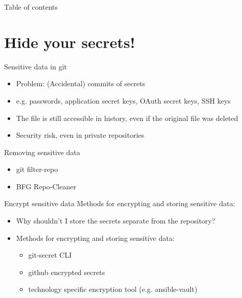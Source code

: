 \documentclass[compress,aspectratio=169]{beamer}
\begin{document}
	\begin{frame}[plain]
		\titlepage
	\end{frame}

	\begin{frame}[t]{Table of contents}
		\tableofcontents[subsectionstyle=hide/hide]
	\end{frame}


	\section{Hide your secrets!}

		\begin{frame}{Sensitive data in git}
			\begin{itemize}
				\item Problem: (Accidental) commits of secrets
				\item e.g. passwords, application secret keys, OAuth secret keys, SSH keys
				\item The file is still accessible in history, even if the original file was deleted
				\item Security risk, even in private repositories
			\end{itemize}	
		\end{frame}

		\begin{frame}{Removing sensitive data}
			\begin{itemize}
				\item git filter-repo
				\item BFG Repo-Cleaner
			\end{itemize}
		\end{frame}
		
		\begin{frame}{Encrypt sensitive data}
			Methods for encrypting and storing sensitive data:
			\begin{itemize}
				\item 	Why shouldn't I store the secrets separate from the repository?
				\item 	Methods for encrypting and storing sensitive data:
						\begin{itemize}
							\item git-secret CLI 
							\item github encrypted secrets
							\item technology specific encryption tool (e.g. ansible-vault)
						\end{itemize}
			\end{itemize}
		\end{frame}
\end{document}
